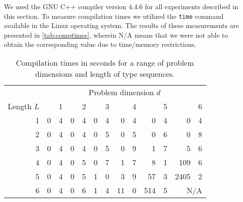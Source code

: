 \documentclass[10pt,a4paper]{article}
\theoremstyle{definition}\newtheorem{problem}{Problem}
\begin{document}
We used the GNU C++ compiler version 4.4.6 for all experiments described in this section. To measure compilation times we utilized the \texttt{time} command available in the Linux operating system. The results of these measurements are presented in \autoref{tab:comptimes}, wherein N/A means that we were not able to obtain the corresponding value due to time/memory restrictions.
\renewcommand{\arraystretch}{1.00}
\renewcommand{\tabcolsep}{3mm}
\begin{table}[t]
\caption{Compilation times in seconds for a range of problem dimensions and length of type sequences.} \begin{center}
\begin{tabular}{r*{6}{r@{.}l}}
\toprule
 & \multicolumn{12}{c}{Problem dimension $d$} \\ \cmidrule(l){2-13}
Length $L$ & \multicolumn{2}{r}{1} & \multicolumn{2}{r}{2} & \multicolumn{2}{r}{3} & \multicolumn{2}{r}{4} & \multicolumn{2}{r}{5} & \multicolumn{2}{r}{6} \\ \cmidrule(r){1-1} \cmidrule(l){2-13}
1 & 0 & 4 & 0 & 4 & 0 & 4 & 0 & 4 & 0 & 4 & 0 & 4 \\
2 & 0 & 4 & 0 & 4 & 0 & 5 & 0 & 5 & 0 & 6 & 0 & 8 \\
3 & 0 & 4 & 0 & 4 & 0 & 5 & 0 & 9 & 1 & 7 & 5 & 6 \\
4 & 0 & 4 & 0 & 5 & 0 & 7 & 1 & 7 & 8 & 1 & 109 & 6 \\
5 & 0 & 4 & 0 & 5 & 1 & 0 & 3 & 9 & 57 & 3 & 2405 & 2 \\
6 & 0 & 4 & 0 & 6 & 1 & 4 & 11 & 0 & 514 & 5 & \multicolumn{2}{r}{N/A} \\
\bottomrule
\end{tabular}
\end{center}
\label{tab:comptimes}
\end{table}
\end{document}
